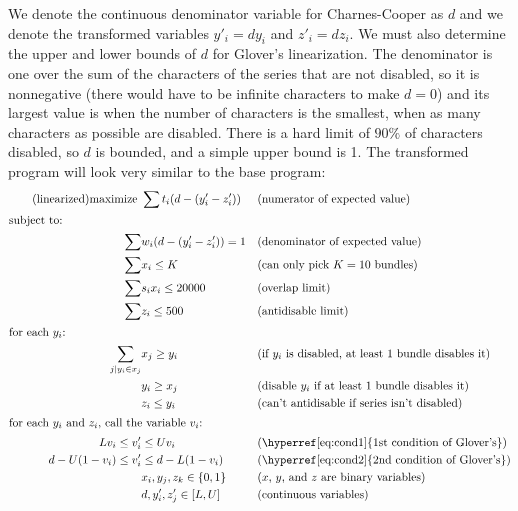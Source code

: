 \documentclass[11pt, oneside]{article}
\theoremstyle{plain}
\theoremstyle{definition}
\begin{document}
We denote the continuous denominator variable for Charnes-Cooper as \( d \)
and we denote the transformed variables \( y'_i = d y_i \) and \( z'_i = d z_i
\). We must also determine the upper and lower bounds of \( d \) for Glover's
linearization. The denominator is one over the sum of the characters of the
series that are not disabled, so it is nonnegative (there would have to be
infinite characters to make \( d = 0 \)) and its largest value is when the
number of characters is the smallest, when as many characters as possible are
disabled. There is a hard limit of \( 90\% \) of characters disabled, so \(
d \) is bounded, and a simple upper bound is 1. The transformed program will
look very similar to the base program:
\begin{align*}
  \tag{linearized} \label{eq:milfp}
  \text{maximize } &\sum t_i (d - (y'_i - z'_i))
  && \text{(numerator of expected value)} \\ 
  \shortintertext{subject to:}
  \sum& w_i (d - (y'_i - z'_i)) = 1 && \text{(denominator of expected value)} \\
  \sum& x_i \leq K && \text{(can only pick \( K = 10 \) bundles)} \\
  \sum& s_i x_i \leq 20000 && \text{(overlap limit)} \\
  \sum& z_i \leq 500 && \text{(antidisable limit)} \\
  \shortintertext{for each \( y_i \):}
  \sum_{j | y_i \in x_j}& x_j \geq y_i && 
  \text{(if \( y_i \) is disabled, at least 1 bundle disables it)} \\
                        & y_i \geq x_j && 
  \text{(disable \( y_i \) if at least 1 bundle disables it)} \\
                        & z_i \leq y_i &&
  \text{(can't antidisable if series isn't disabled)} \\
  \shortintertext{for each \( y_i \) and \( z_i \), call the variable \( v_i \):} 
  L v_i \leq v'_i & \leq U v_i
                  && \text{(\hyperref[eq:cond1]{1st condition of Glover's})} \\
  d - U(1 - v_i) \leq v'_i & \leq d - L(1 - v_i)  
                  && \text{(\hyperref[eq:cond2]{2nd condition of Glover's})} \\
  &x_i, y_j, z_k \in \{0, 1\} && \text{(\( x \), \( y \), and \( z \) are binary variables)} \\
  &d, y'_i, z'_j \in  [L, U] && \text{(continuous variables)} \\
\end{align*}
\end{document}
